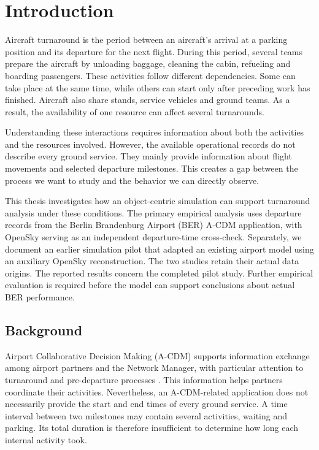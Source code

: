 \chapter{Introduction}
\label{ch:intro}

Aircraft turnaround is the period between an aircraft's arrival at a parking position and its departure for the next flight. During this period, several teams prepare the aircraft by unloading baggage, cleaning the cabin, refueling and boarding passengers. These activities follow different dependencies. Some can take place at the same time, while others can start only after preceding work has finished. Aircraft also share stands, service vehicles and ground teams. As a result, the availability of one resource can affect several turnarounds.

Understanding these interactions requires information about both the activities and the resources involved. However, the available operational records do not describe every ground service. They mainly provide information about flight movements and selected departure milestones. This creates a gap between the process we want to study and the behavior we can directly observe.

This thesis investigates how an object-centric simulation can support turnaround analysis under these conditions. The primary empirical analysis uses departure records from the Berlin Brandenburg Airport (BER) A-CDM application, with OpenSky serving as an independent departure-time cross-check. Separately, we document an earlier simulation pilot that adapted an existing airport model using an auxiliary OpenSky reconstruction. The two studies retain their actual data origins. The reported results concern the completed pilot study. Further empirical evaluation is required before the model can support conclusions about actual BER performance.

\section{Background}
Airport Collaborative Decision Making (A-CDM) supports information exchange among airport partners and the Network Manager, with particular attention to turnaround and pre-departure processes \cite{eurocontrol_acdm}. This information helps partners coordinate their activities. Nevertheless, an A-CDM-related application does not necessarily provide the start and end times of every ground service. A time interval between two milestones may contain several activities, waiting and parking. Its total duration is therefore insufficient to determine how long each internal activity took.

